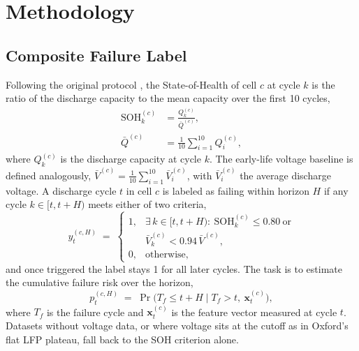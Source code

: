 \documentclass[IJPHM, 2014, 00]{PHMSociety}
\begin{document}
\section{Methodology}

\subsection{Composite Failure Label}
Following the original protocol \cite{shikdar2026learning}, the State-of-Health of cell $c$ at cycle $k$ is the ratio of the discharge capacity to the mean capacity over the first 10 cycles,
\begin{equation}\label{eq:soh}
\begin{aligned}
\mathrm{SOH}_k^{(c)} &= \frac{Q_k^{(c)}}{\bar{Q}^{(c)}},\\[2pt]
\bar{Q}^{(c)} &= \frac{1}{10}\sum_{i=1}^{10} Q_i^{(c)},
\end{aligned}
\end{equation}
where $Q_k^{(c)}$ is the discharge capacity at cycle $k$. The early-life voltage baseline is defined analogously, $\bar{V}^{(c)}=\frac{1}{10}\sum_{i=1}^{10}\bar{V}_i^{(c)}$, with $\bar{V}_i^{(c)}$ the average discharge voltage. A discharge cycle $t$ in cell $c$ is labeled as failing within horizon $H$ if any cycle $k\in[t,t{+}H)$ meets either of two criteria,
\begin{equation}\label{eq:label}
y_t^{(c,H)} \;=\; \begin{cases}
1, & \exists\, k\in[t,t{+}H):\ \mathrm{SOH}_k^{(c)}\le 0.80 \ \text{or}\\[2pt]
& \bar{V}_k^{(c)} < 0.94\,\bar{V}^{(c)},\\[2pt]
0, & \text{otherwise,}
\end{cases}
\end{equation}
and once triggered the label stays 1 for all later cycles. The task is to estimate the cumulative failure risk over the horizon,
\begin{equation}\label{eq:risk}
p_t^{(c,H)} \;=\; \Pr\!\bigl(T_f \le t{+}H \mid T_f > t,\ \mathbf{x}_t^{(c)}\bigr),
\end{equation}
where $T_f$ is the failure cycle and $\mathbf{x}_t^{(c)}$ is the feature vector measured at cycle $t$. Datasets without voltage data, or where voltage sits at the cutoff as in Oxford's flat LFP plateau, fall back to the SOH criterion alone.
\end{document}
